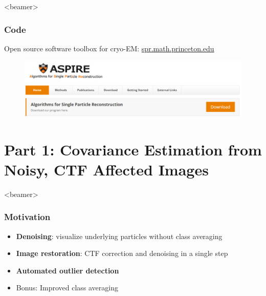 \documentclass{beamer}
\begin{document}
\begin{frame}<beamer>
\frametitle{Code}
Open source software toolbox for cryo-EM: \url{spr.math.princeton.edu}
\begin{figure}\flushleft
\centering
\includegraphics[scale=0.45]{figures/aspire.png}
\end{figure}

\end{frame}

\section{Part 1: Covariance Estimation from Noisy, CTF Affected Images}
%
% 
%

\begin{frame}<beamer>
\frametitle{Motivation}
\begin{itemize}[]
 \item \textbf{Denoising}: visualize underlying particles without class averaging
 \item \textbf{Image restoration}: CTF correction and denoising in a single step
  \item \textbf{Automated outlier detection}
  \item Bonus: Improved class averaging
\end{itemize}
\end{frame}
\end{document}
